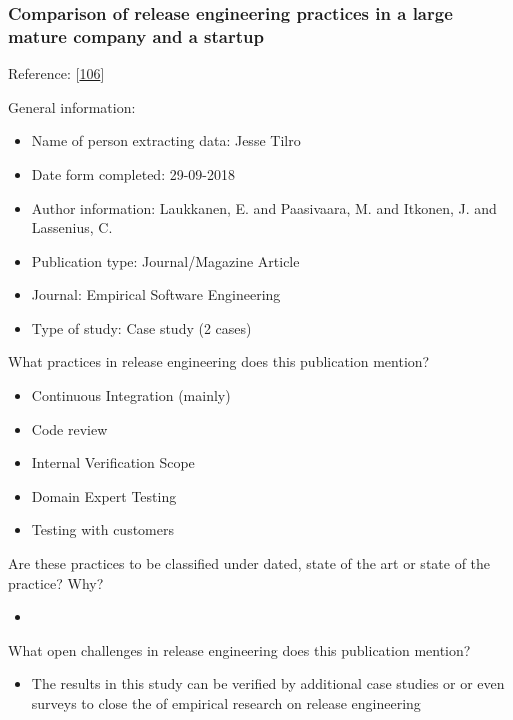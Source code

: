 \documentclass[]{book}
\providecommand{\tightlist}{%
  \setlength{\itemsep}{0pt}\setlength{\parskip}{0pt}}
\begin{document}
\subsubsection{Comparison of release engineering practices in a large
mature company and a
startup}\label{comparison-of-release-engineering-practices-in-a-large-mature-company-and-a-startup}

Reference: {[}\protect\hyperlink{ref-laukkanen2018a}{106}{]}

General information:

\begin{itemize}
\tightlist
\item
  Name of person extracting data: Jesse Tilro
\item
  Date form completed: 29-09-2018
\item
  Author information: Laukkanen, E. and Paasivaara, M. and Itkonen, J.
  and Lassenius, C.
\item
  Publication type: Journal/Magazine Article
\item
  Journal: Empirical Software Engineering
\item
  Type of study: Case study (2 cases)
\end{itemize}

What practices in release engineering does this publication mention?

\begin{itemize}
\tightlist
\item
  Continuous Integration (mainly)
\item
  Code review
\item
  Internal Verification Scope
\item
  Domain Expert Testing
\item
  Testing with customers
\end{itemize}

Are these practices to be classified under dated, state of the art or
state of the practice? Why?

\begin{itemize}
\item
\end{itemize}

What open challenges in release engineering does this publication
mention?

\begin{itemize}
\tightlist
\item
  The results in this study can be verified by additional case studies
  or or even surveys to close the of empirical research on release
  engineering
\end{itemize}
\end{document}
